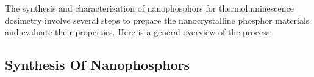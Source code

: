 \documentclass[../../Report.tex]{subfiles}
\begin{document}
    The synthesis and characterization of nanophosphors for thermoluminescence dosimetry involve several steps to 
    prepare the nanocrystalline phosphor materials and evaluate their properties. Here is a general overview of 
    the process:

    \subsection{\large Synthesis Of Nanophosphors}
        
\end{document}
